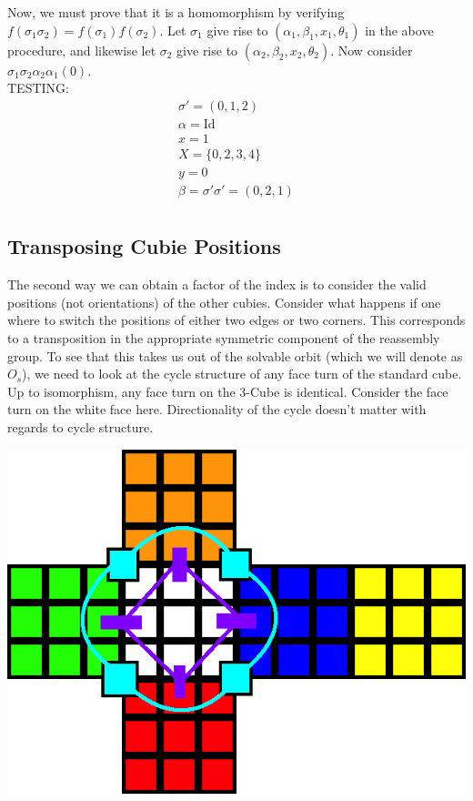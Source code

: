 \documentclass[10pt,letterpaper]{report}
\begin{document}
Now, we must prove that it is a homomorphism by verifying $f(\sigma_1 \sigma_2) = f(\sigma_1)f(\sigma_2)$.  Let $\sigma_1$ give rise to $(\alpha_1, \beta_1, x_1, \theta_1)$ in the above procedure, and likewise let $\sigma_2$ give rise to $(\alpha_2, \beta_2, x_2, \theta_2)$.  Now consider $\sigma_1 \sigma_2 \alpha_2 \alpha_1 (0)$. \\

TESTING: \begin{align*}
\sigma' = (0,1,2) \\
\alpha = \text{Id} \\
x = 1 \\
X = \{0,2,3,4\} \\
y = 0 \\
\beta = 
\sigma' \sigma' = (0,2,1) \\
\end{align*}

\subsection{Transposing Cubie Positions}

The second way we can obtain a factor of the index is to consider the valid positions (not orientations) of the other cubies.  Consider what happens if one where to switch the positions of either two edges or two corners.  This corresponds to a transposition in the appropriate symmetric component of the reassembly group.  To see that this takes us out of the solvable orbit (which we will denote as $O_s$), we need to look at the cycle structure of any face turn of the standard cube. \\

Up to isomorphism, any face turn on the 3-Cube is identical.  Consider the face turn on the white face here.  Directionality of the cycle doesn't matter with regards to cycle structure.

\begin{center}
\includegraphics[scale=.5]{images/faceCubieCycle.png} 
\end{center}
\end{document}
